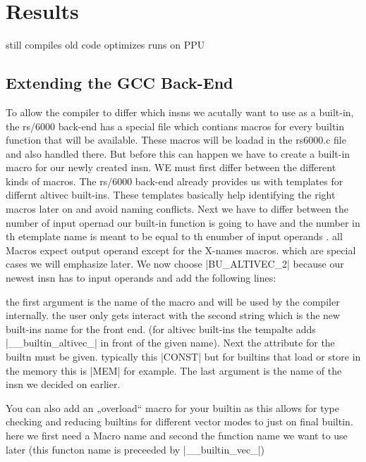 \chapter{Results}
\label{chapter:results}

still compiles old code
optimizes
runs on PPU

\section{Extending the GCC Back-End}
\label{section:extbackend}

To allow the compiler to differ which insns we acutally want to use as a built-in, the rs/6000 back-end has a special file which contians macros for every builtin function that will be available.
These  macros will be loadad in the rs6000.c file and also handled there.
But before this can happen we have to create a built-in macro for our newly created insn.
WE must first differ between the different kinds of macros.
The rs/6000 back-end already provides us with templates for differnt altivec built-ins.
These templates basically help identifying the right macros later on and avoid naming conflicts.
Next we have to differ between the number of input opernad our built-in function is going to have and the number  in th etemplate name is meant to be equal to th enumber of input operands .
all Macros expect output operand except for the X-names macros.
which are special cases we will emphasize later.
We now choose |BU_ALTIVEC_2| because our newest insn has to input operands and add the following lines:

the first argument is the name of the macro and will be used by the compiler internally.
the user only gets interact with the second string which is the new built-ins name for the front end.
(for altivec built-ins the tempalte adds |__builtin_altivec_| in front of the given name).
Next the attribute for the builtn must be given.
typically this |CONST| but for builtins that load or store in the memory this is |MEM| for example.
The last argument is the name of the insn we decided on earlier.

You can also add an „overload“ macro for your builtin as this allows for type checking and reducing builtins for different vector modes to just on final builtin.
here we first need a Macro name and second the function name we want to use later (this functon name is preceeded by |__builtin_vec_|)


